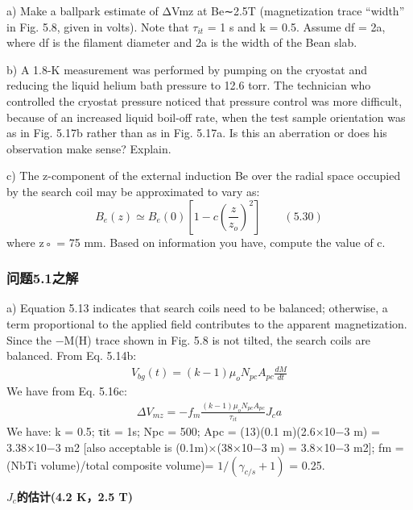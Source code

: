 a) Make a ballpark estimate of ΔVmz at Be∼2.5T (magnetization trace “width”
in Fig. 5.8, given in volts). Note that $\tau_{it}$ = 1 s and k = 0.5. Assume df = 2a,
where df is the filament diameter and 2a is the width of the Bean slab.

b) A 1.8-K measurement was performed by pumping on the cryostat and reducing
the liquid helium bath pressure to 12.6 torr. The technician who controlled
the cryostat pressure noticed that pressure control was more difficult,
because of an increased liquid boil-off rate, when the test sample orientation
was as in Fig. 5.17b rather than as in Fig. 5.17a. Is this an aberration or
does his observation make sense? Explain.

c) The z-component of the external induction Be over the radial space occupied
by the search coil may be approximated to vary as:
\begin{equation}%
B_{e}(z)\simeq B_{e}(0)[1-c(\frac{z}{z_{o}})^{2}]\qquad(5.30)
\end{equation}
where z◦ = 75 mm. Based on information you have, compute the value of c.

\subsubsection{问题5.1之解}
a) Equation 5.13 indicates that search coils need to be balanced; otherwise, a
term proportional to the applied field contributes to the apparent magnetization.
Since the −M(H) trace shown in Fig. 5.8 is not tilted, the search coils are balanced.
From Eq. 5.14b:
\begin{align*}%
V_{bg}(t)=(k-1)\mu_{o}N_{pc}A_{pc}\frac{dM}{dt}\tag{5.14b}
\end{align*}
We have from Eq. 5.16c:
\begin{align*}%
\Delta V_{mz}=-f_{m}\frac{(k-1)\mu_{o}N_{pc}A_{pc}}{\tau_{it}}J_{c}a\tag{5.16c}
\end{align*}
We have: k = 0.5; τit = 1s; Npc = 500; Apc = (13)(0.1 m)(2.6×10−3 m) =
3.38×10−3 m2 [also acceptable is (0.1m)×(38×10−3 m) = 3.8×10−3 m2]; fm =(NbTi
volume)/total composite volume)= $1/(\gamma_{c/s} + 1)$ = 0.25.

\textbf{$J_c$的估计(4.2 K，2.5 T)}

